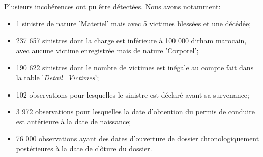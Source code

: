 Plusieurs incoh\'erences ont pu \^etre d\'etect\'ees. Nous avons notamment:
\begin{itemize}[parsep=0cm,itemsep=0cm]
\item 1 sinistre de nature 'Materiel' mais avec 5 victimes bless\'ees et une d\'ec\'ed\'ee; 
\item 237 657 sinistres dont la charge est inf\'erieure \`a 100 000 dirham marocain, avec aucune victime enregistr\'ee mais de nature 'Corporel'; 
\item 190 622 sinistres dont le nombre de victimes est in\'egale au compte fait dans la table '\textit{Detail\_Victimes}';
\item 102 observations pour lesquelles le sinistre est d\'eclar\'e avant sa survenance;
\item 3 972 observations pour lesquelles la date d'obtention du permis de conduire est ant\'erieure \`a la date de naissance;
\item 76 000 observations ayant des dates d'ouverture de dossier chronologiquement post\'erieures \`a la date de clôture du dossier.
\end{itemize}


